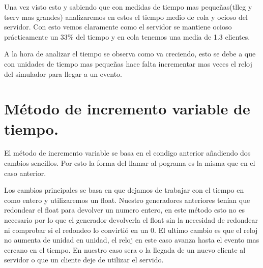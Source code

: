 \documentclass[]{article}
\begin{document}
Una vez visto esto y sabiendo que con medidas de tiempo mas pequeñas(tlleg y tserv mas grandes) analizaremos en estos el tiempo medio de cola y ocioso del servidor. Con esto vemos claramente como el servidor se mantiene ocioso prácticamente un 33\% del tiempo y en cola tenemos una media de 1.3 clientes.
\newline

A la hora de analizar el tiempo se observa como va creciendo, esto se debe a que con unidades de tiempo mas pequeñas hace falta incrementar mas veces el reloj del simulador para llegar a un evento. 

\section{Método de incremento variable de tiempo.}
El método de incremento variable se basa en el condigo anterior añadiendo dos cambios sencillos. Por esto la forma del llamar al pograma es la misma que en el caso anterior.
\newline

Los cambios principales se basa en que dejamos de trabajar con el tiempo en como entero y utilizaremos un float. Nuestro generadores anteriores tenían que redondear el float para devolver un numero entero, en este método esto no es necesario por lo que el generador devolverla el float sin la necesidad de redondear ni comprobar si el redondeo lo convirtió en un 0. El ultimo cambio es que el reloj no aumenta de unidad en unidad, el reloj en este caso avanza hasta el evento mas cercano en el tiempo. En nuestro caso sera o la llegada de un nuevo cliente al servidor o que un cliente deje de utilizar el servido. 
\newline
\end{document}
